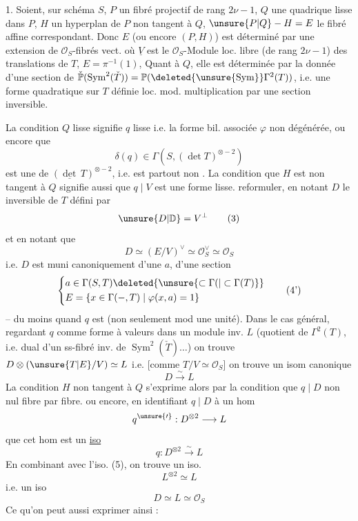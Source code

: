 1. Soient, sur schéma $S$, $P$ un fibré projectif de rang $2\nu-1$, $Q$ une quadrique lisse dans $P$, $H$ un hyperplan de $P$ non tangent à $Q$, $\unsure{P|Q}-H=E$ le fibré affine correspondant. Donc $E$ (ou encore $(P,H)$) est déterminé par une extension de $\mathcal O_S$-fibrés vect.
où $\underline V$ est le $\mathcal O_S$-Module loc. libre (de rang $2\nu-1$) des translations de $T$, $E=\pi^{-1}(1)$,  Quant à $Q$, elle est déterminée par la donnée d'une section de $\check{\mathbb P}(\operatorname{Sym}^2(\check T))=\mathbb P(\deleted{\unsure{\operatorname{Sym}}}\Gamma^2(T))$, i.e. une forme quadratique  sur $T$ définie loc. mod. multiplication par une section inversible.

La condition $Q$ lisse signifie $q$ lisse i.e. la forme bil. associée $\varphi$ non dégénérée, ou encore que
\[
\delta(q)\in\Gamma(S,(\det T)^{\otimes-2})\tag*{(2)}
\]
est une  de $(\underline{\det}\,T)^{\otimes-2}$, i.e. est partout non . La condition que $H$ est non tangent à $Q$ signifie aussi que $q\mid V$ est une forme lisse.  reformuler, en notant $D$ le  inversible
de $T$ défini par
\[
\unsure{D|\mathbb D}=V^\perp\tag*{(3)}
\]
et en notant que
\[
D\simeq(E/V)^\vee\simeq\mathcal O_S^\vee\simeq\mathcal O_S\tag*{(4)}
\]
i.e. $D$ est muni canoniquement d'une  $a$,  d'une section
\[
\left\{\begin{aligned}
&a\in\Gamma(S,T)\deleted{\unsure{\subset\Gamma(|\subset\Gamma(T)}}\\
&E=\{x\in\Gamma(-,T)\mid\varphi(x,a)=1\}
\end{aligned}\right.\tag*{(4')}
\]
-- du moins quand $q$ est \uline{}  (non seulement mod une unité). Dans le cas général, regardant $q$ comme forme à valeurs dans un module inv. $L$ (quotient de $\Gamma^2(T)$, i.e. dual d'un ss-fibré inv. de $\operatorname{Sym}^2(\check T)\ldots$) on trouve $D\otimes(\unsure{T|E}/V)\simeq L$ i.e. [comme $T/V\simeq\mathcal O_S$] on trouve un isom canonique
\[
D\xrightarrow{\sim}L\tag*{(5)}
\]
La condition $H$ non tangent à $Q$ s'exprime alors par la condition que
$q\mid D$ non nul fibre par fibre.
ou encore, en identifiant $q\mid D$ à un hom
\[
q^{\unsure{\prime}}:D^{\otimes2}\longrightarrow L
\]
que cet hom est un \uline{iso}
\[
q:D^{\otimes2}\xrightarrow{\sim}L\tag*{(6)}
\]
 En combinant avec l'iso. (5), on trouve un iso.
\[
L^{\otimes2}\simeq L
\]
i.e. un iso
\[
D\simeq L\simeq\mathcal O_S\tag*{(7)}
\]
Ce qu'on peut aussi exprimer ainsi :

